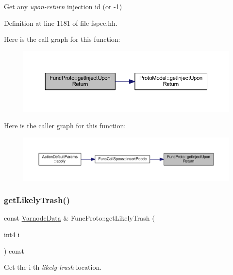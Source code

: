Get any {\itshape upon-\/return} injection id (or -\/1) 



Definition at line 1181 of file fspec.\+hh.

Here is the call graph for this function\+:
\nopagebreak
\begin{figure}[H]
\begin{center}
\leavevmode
\includegraphics[width=350pt]{class_func_proto_a3c835c084a2714801d06d68631aa52ec_cgraph}
\end{center}
\end{figure}
Here is the caller graph for this function\+:
\nopagebreak
\begin{figure}[H]
\begin{center}
\leavevmode
\includegraphics[width=350pt]{class_func_proto_a3c835c084a2714801d06d68631aa52ec_icgraph}
\end{center}
\end{figure}
\mbox{\label{class_func_proto_a078b7588849b80acc7c1d1ba13cda5f3}} 
\subsubsection{\texorpdfstring{getLikelyTrash()}{getLikelyTrash()}}
{\footnotesize\ttfamily const \mbox{\hyperlink{struct_varnode_data}{Varnode\+Data}} \& Func\+Proto\+::get\+Likely\+Trash (\begin{DoxyParamCaption}\item[{int4}]{i }\end{DoxyParamCaption}) const}



Get the i-\/th {\itshape likely-\/trash} location. 


